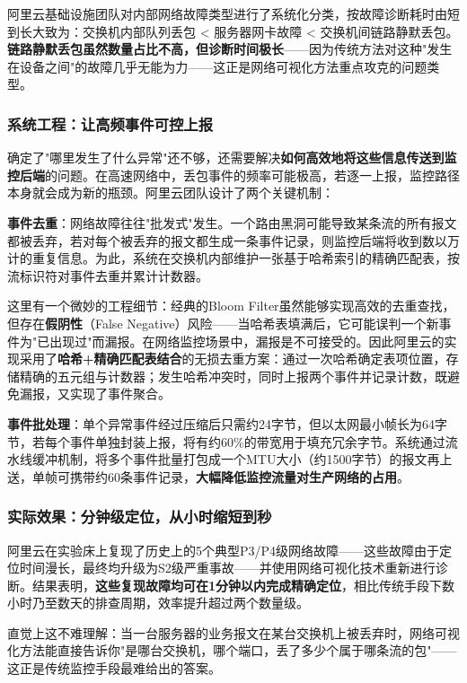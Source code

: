 阿里云基础设施团队对内部网络故障类型进行了系统化分类，按故障诊断耗时由短到长大致为：交换机内部队列丢包 < 服务器网卡故障 < 交换机间链路静默丢包。\textbf{链路静默丢包虽然数量占比不高，但诊断时间极长}——因为传统方法对这种"发生在设备之间"的故障几乎无能为力——这正是网络可视化方法重点攻克的问题类型。

\subsubsection{系统工程：让高频事件可控上报}

确定了"哪里发生了什么异常"还不够，还需要解决\textbf{如何高效地将这些信息传送到监控后端}的问题。在高速网络中，丢包事件的频率可能极高，若逐一上报，监控路径本身就会成为新的瓶颈。阿里云团队设计了两个关键机制：

\textbf{事件去重}：网络故障往往"批发式"发生。一个路由黑洞可能导致某条流的所有报文都被丢弃，若对每个被丢弃的报文都生成一条事件记录，则监控后端将收到数以万计的重复信息。为此，系统在交换机内部维护一张基于哈希索引的精确匹配表，按流标识符对事件去重并累计计数器。

这里有一个微妙的工程细节：经典的Bloom Filter虽然能够实现高效的去重查找，但存在\textbf{假阴性}（False Negative）风险——当哈希表填满后，它可能误判一个新事件为"已出现过"而漏报。在网络监控场景中，漏报是不可接受的。因此阿里云的实现采用了\textbf{哈希+精确匹配表结合}的无损去重方案：通过一次哈希确定表项位置，存储精确的五元组与计数器；发生哈希冲突时，同时上报两个事件并记录计数，既避免漏报，又实现了事件聚合。

\textbf{事件批处理}：单个异常事件经过压缩后只需约24字节，但以太网最小帧长为64字节，若每个事件单独封装上报，将有约60\%的带宽用于填充冗余字节。系统通过流水线缓冲机制，将多个事件批量打包成一个MTU大小（约1500字节）的报文再上送，单帧可携带约60条事件记录，\textbf{大幅降低监控流量对生产网络的占用}。

\subsubsection{实际效果：分钟级定位，从小时缩短到秒}

阿里云在实验床上复现了历史上的5个典型P3/P4级网络故障——这些故障由于定位时间漫长，最终均升级为S2级严重事故——并使用网络可视化技术重新进行诊断。结果表明，\textbf{这些复现故障均可在1分钟以内完成精确定位}，相比传统手段下数小时乃至数天的排查周期，效率提升超过两个数量级。

直觉上这不难理解：当一台服务器的业务报文在某台交换机上被丢弃时，网络可视化方法能直接告诉你"是哪台交换机，哪个端口，丢了多少个属于哪条流的包"——这正是传统监控手段最难给出的答案。

